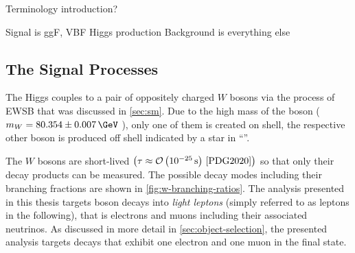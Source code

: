 Terminology introduction?

Signal is ggF, VBF Higgs production
Background is everything else

\subsection{The Signal Processes}

The Higgs couples to a pair of oppositely charged $W$ bosons via the process of EWSB that was discussed in \cref{sec:sm}. Due to the high mass of the \Wboson boson ($m_W = 80.354 \pm 0.007\,\GeV$ \cite{PDG2020}), only one of them is created on shell, the respective other boson is produced off shell indicated by a star in ``\HWW''.

The $W$ bosons are short-lived $\left( \tau \approx \mathcal{O}\left(10^{-25}\,\text{s}\right)\,\text{\cite{PDG2020}}  \right)$ so that only their decay products can be measured. The possible decay modes including their branching fractions are shown in \cref{fig:w-branching-ratios}. The analysis presented in this thesis targets \Wboson boson decays into \emph{light leptons} (simply referred to as leptons in the following), that is electrons and muons including their associated neutrinos.
As discussed in more detail in \cref{sec:object-selection}, the presented analysis targets \HWW decays that exhibit one electron and one muon in the final state.

